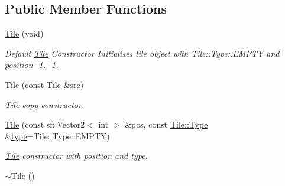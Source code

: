 \subsection*{Public Member Functions}
\begin{DoxyCompactItemize}
\item 
\hypertarget{class_tile_a93fdcc8c693044a3bb3590bdb6daed2a}{\hyperlink{class_tile_a93fdcc8c693044a3bb3590bdb6daed2a}{Tile} (void)}\label{class_tile_a93fdcc8c693044a3bb3590bdb6daed2a}

\begin{DoxyCompactList}\small\item\em Default \hyperlink{class_tile}{Tile} Constructor Initialises tile object with Tile\-::\-Type\-::\-E\-M\-P\-T\-Y and position -\/1, -\/1. \end{DoxyCompactList}\item 
\hyperlink{class_tile_a43886ac5f7fbcc05b5c26e34371ec599}{Tile} (const \hyperlink{class_tile}{Tile} \&src)
\begin{DoxyCompactList}\small\item\em \hyperlink{class_tile}{Tile} copy constructor. \end{DoxyCompactList}\item 
\hyperlink{class_tile_ab7a5adaebb9e705923681daf52f1db74}{Tile} (const sf\-::\-Vector2$<$ int $>$ \&pos, const \hyperlink{class_tile_afa5ef05a7f2ea1f3e44398c001abc738}{Tile\-::\-Type} \&\hyperlink{class_tile_af6644c418cbb05f4af1bb0bae756a96f}{type}=Tile\-::\-Type\-::\-E\-M\-P\-T\-Y)
\begin{DoxyCompactList}\small\item\em \hyperlink{class_tile}{Tile} constructor with position and type. \end{DoxyCompactList}\item 
\hypertarget{class_tile_a98634abbd93fa13d0578d7103202d03d}{\hyperlink{class_tile_a98634abbd93fa13d0578d7103202d03d}{$\sim$\-Tile} ()}\label{class_tile_a98634abbd93fa13d0578d7103202d03d}


\end{DoxyCompactItemize}
